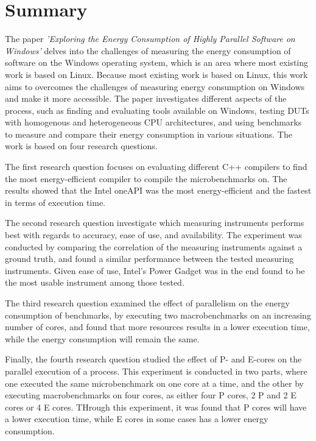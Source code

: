 \section*{Summary}

The paper \textit{'Exploring the Energy Consumption of Highly Parallel Software on Windows'} delves into the challenges of measuring the energy consumption of software on the Windows operating system, which is an area where most existing work is based on Linux. Because most existing work is based on Linux, this work aims to overcomes the challenges of measuring energy consumption on Windows and make it more accessible. The paper investigates different aspects of the process, such as finding and evaluating tools available on Windows, testing DUTs with homogenous and heterogeneous CPU architectures, and using benchmarks to measure and compare their energy consumption in various situations. The work is based on four research questions.

The first research question focuses on evaluating different C++ compilers to find the most energy-efficient compiler to compile the microbenchmarks on. The results showed that the Intel oneAPI was the most energy-efficient and the fastest in terms of execution time. 

The second research question investigate which measuring instruments performs best with regards to accuracy, ease of use, and availability. The experiment was conducted by comparing the correlation of the measuring instruments against a ground truth, and found a similar performance between the tested measuring instruments. Given ease of use, Intel's Power Gadget was in the end found to be the most usable instrument among those tested.

The third research question examined the effect of parallelism on the energy consumption of benchmarks, by executing two macrobenchmarks on an increasing number of cores, and found that more resources results in a lower execution time, while the energy consumption will remain the same. 

Finally, the fourth research question studied the effect of P- and E-cores on the parallel execution of a process. This experiment is conducted in two parts, where one executed the same microbenchmark on one core at a time, and the other by executing macrobenchmarks on four cores, as either four P cores, 2 P and 2 E cores or 4 E cores. THrough this experiment, it was found that P cores will have a lower execution time, while E cores in some cases has a lower energy consumption.

